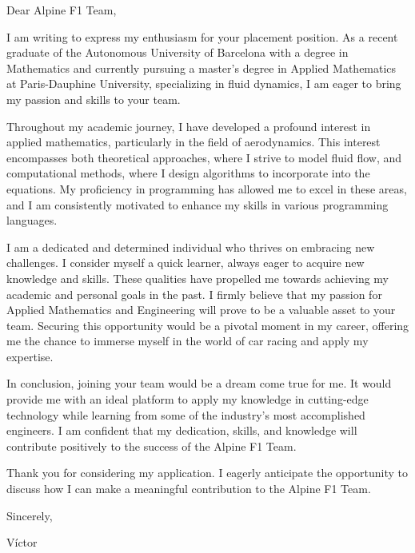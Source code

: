 \documentclass[11pt]{letter}
\begin{document}
\thispagestyle{empty}
Dear Alpine F1 Team,

I am writing to express my enthusiasm for your placement position. As a recent graduate of the Autonomous University of Barcelona with a degree in Mathematics and currently pursuing a master's degree in Applied Mathematics at Paris-Dauphine University, specializing in fluid dynamics, I am eager to bring my passion and skills to your team.

Throughout my academic journey, I have developed a profound interest in applied mathematics, particularly in the field of aerodynamics. This interest encompasses both theoretical approaches, where I strive to model fluid flow, and computational methods, where I design algorithms to incorporate into the equations. My proficiency in programming has allowed me to excel in these areas, and I am consistently motivated to enhance my skills in various programming languages.

I am a dedicated and determined individual who thrives on embracing new challenges. I consider myself a quick learner, always eager to acquire new knowledge and skills. These qualities have propelled me towards achieving my academic and personal goals in the past. I firmly believe that my passion for Applied Mathematics and Engineering will prove to be a valuable asset to your team. Securing this opportunity would be a pivotal moment in my career, offering me the chance to immerse myself in the world of car racing and apply my expertise.

In conclusion, joining your team would be a dream come true for me. It would provide me with an ideal platform to apply my knowledge in cutting-edge technology while learning from some of the industry's most accomplished engineers. I am confident that my dedication, skills, and knowledge will contribute positively to the success of the Alpine F1 Team.

Thank you for considering my application. I eagerly anticipate the opportunity to discuss how I can make a meaningful contribution to the Alpine F1 Team.

Sincerely,

Víctor
\end{document}
